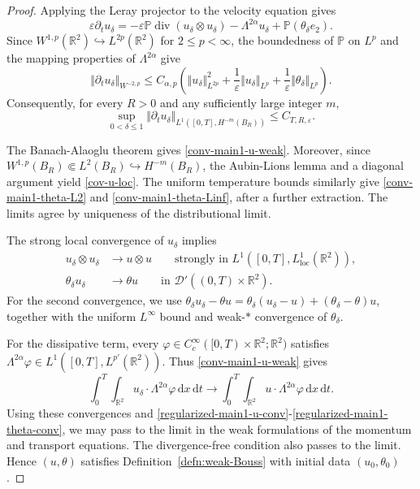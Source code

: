 \documentclass[reqno,11pt,a4paper]{amsart}
\newcommand{\dd}{\mathrm{d}}
\begin{document}
\begin{proof}
Applying the Leray projector to the velocity equation gives
\[
  \varepsilon\partial_tu_\delta
  =
  -\varepsilon\mathbb P\operatorname{div}
    (u_\delta\otimes u_\delta)
  -\Lambda^{2\alpha}u_\delta
  +\mathbb P(\theta_\delta e_2).
\]
Since $W^{1,p}(\mathbb R^2)\hookrightarrow L^{2p}(\mathbb R^2)$
for $2\leq p<\infty$, the boundedness of $\mathbb P$ on
$L^p$ and the mapping properties of $\Lambda^{2\alpha}$ give
\[
  \Vert \partial_tu_\delta\Vert _{W^{-2,p}}
  \leq C_{\alpha,p}\left(
    \Vert u_\delta\Vert _{L^{2p}}^2
    +\frac1\varepsilon\Vert u_\delta\Vert _{L^p}
    +\frac1\varepsilon\Vert \theta_\delta\Vert _{L^p}
  \right).
\]
Consequently, for every $R>0$ and any sufficiently large
integer $m$,
\begin{equation}\label{regularized-main1-time-bound}
  \sup_{0<\delta\leq1}
  \Vert \partial_tu_\delta\Vert _{L^1([0,T],H^{-m}(B_R))}
  \leq C_{T,R,\varepsilon}.
\end{equation}

The Banach-Alaoglu theorem gives
\eqref{conv-main1-u-weak}.
Moreover, since
$W^{1,p}(B_R)\Subset L^2(B_R)
  \hookrightarrow H^{-m}(B_R)$,
the Aubin-Lions lemma and a diagonal argument yield
\eqref{cov-u-loc}.
The uniform temperature bounds similarly give
\eqref{conv-main1-theta-L2} and
\eqref{conv-main1-theta-Linf}, after a further extraction.
The limits agree by uniqueness of the distributional limit.

The strong local convergence of $u_\delta$ implies
\begin{align}
  u_\delta\otimes u_\delta
  &\longrightarrow u\otimes u
  \qquad\text{strongly in }
  L^1([0,T],L^1_{\mathrm{loc}}(\mathbb R^2)),
  \label{conv-main1-quadratic-u}\\
  \theta_\delta u_\delta
  &\longrightarrow\theta u
  \qquad\text{in }\mathcal D'((0,T)\times\mathbb R^2).
  \label{conv-main1-theta-u}
\end{align}
For the second convergence, we use
$\theta_\delta u_\delta-\theta u
  =
  \theta_\delta(u_\delta-u)+(\theta_\delta-\theta)u$,
together with the uniform $L^\infty$ bound and weak-$\ast$
convergence of $\theta_\delta$.

For the dissipative term, every
$\varphi\in C_c^\infty([0,T)\times\mathbb R^2;\mathbb R^2)$
satisfies
$\Lambda^{2\alpha}\varphi
\in L^1([0,T],L^{p'}(\mathbb R^2))$.
Thus \eqref{conv-main1-u-weak} gives
\[
  \int_0^T\!\int_{\mathbb R^2}
  u_\delta\cdot\Lambda^{2\alpha}\varphi\,\dd x\,\dd t
  \longrightarrow
  \int_0^T\!\int_{\mathbb R^2}
  u\cdot\Lambda^{2\alpha}\varphi\,\dd x\,\dd t.
\]
Using these convergences and
\eqref{regularized-main1-u-conv}-\eqref{regularized-main1-theta-conv}, we may pass to the limit
in the weak formulations of the momentum and transport equations.
The divergence-free condition also passes to the limit.
Hence $(u,\theta)$ satisfies
Definition~\ref{defn:weak-Bouss} with initial data
$(u_0,\theta_0)$.


\end{proof}
\end{document}
